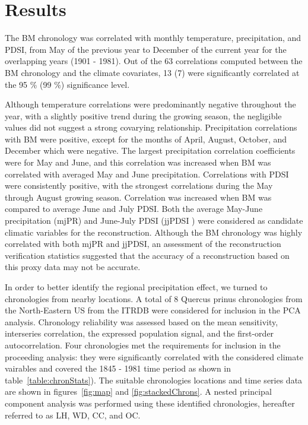 \documentclass[11pt]{article}
\begin{document}

\section{Results}
\label{sec:results}

The BM chronology was correlated with monthly temperature, precipitation, and PDSI, from May of the previous year to December of the current year for the overlapping years (1901 - 1981). Out of the 63 correlations computed between the BM chronology and the climate covariates, 13 (7) were significantly correlated at the 95 \% (99 \%) significance level.

Although temperature correlations were predominantly negative throughout the year, with a slightly positive trend during the growing season, the negligible values did not suggest a strong covarying relationship. Precipitation correlations with BM were positive, except for the months of April, August, October, and December which were negative. The largest precipitation correlation coefficients were for May and June, and this correlation was increased when BM was correlated with averaged May and June precipitation. Correlations with PDSI were consistently positive, with the strongest correlations during the May through August growing season. Correlation was increased when BM was compared to average June and July PDSI. Both the average May-June precipitation (mjPR) and June-July PDSI (jjPDSI ) were considered as candidate climatic variables for the reconstruction. Although the BM chronology was highly correlated with both mjPR and jjPDSI, an assessment of the reconstruction verification statistics suggested that the accuracy of a reconstruction based on this proxy data may not be accurate. 

In order to better identify the regional precipitation effect, we turned to chronologies from nearby locations. A total of 8 Quercus prinus chronologies from the North-Eastern US from the ITRDB were considered for inclusion in the PCA analysis. Chronology reliability was assessed based on the mean sensitivity, interseries correlation, the expressed population signal, and the first-order autocorrelation. Four chronologies met the requirements for inclusion in the proceeding analysis: they were significantly correlated with the considered climate vairables and covered the 1845 - 1981 time period as shown in table~\ref{table:chronStats}). The suitable chronologies locations and time series data are shown in figures~\ref{fig:map} and \ref{fig:stackedChrons}. A nested principal component analysis was performed using these identified chronologies, hereafter referred to as LH, WD, CC, and OC. 
\end{document}

